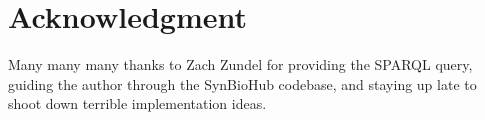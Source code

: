 \documentclass[journal,comsoc]{IEEEtran}
\begin{document}
%





\section*{Acknowledgment}

Many many many thanks to Zach Zundel for providing the SPARQL query,
guiding the author through the SynBioHub codebase, and staying up late 
to shoot down terrible implementation ideas.


\ifCLASSOPTIONcaptionsoff
  \newpage
\fi




\end{document}

